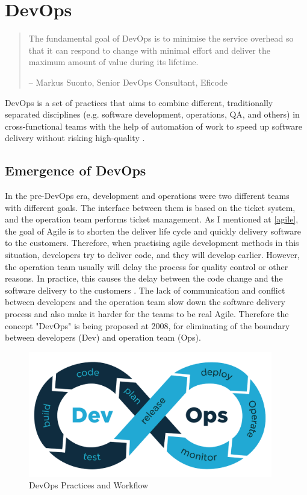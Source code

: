 \section{DevOps}
\begin{quotation}
    The fundamental goal of DevOps is to minimise the service overhead so that it can respond to change with minimal effort and deliver the maximum amount of value during its lifetime.
    \begin{flushright}
        -- Markus Suonto, Senior DevOps Consultant, Eficode
    \end{flushright}
\end{quotation}
\label{devops}
DevOps is a set of practices that aims to combine different, traditionally separated disciplines (e.g. software development, operations, QA, and others) in cross-functional teams with the help of automation of work to speed up software delivery without risking high-quality \cite{bass2015devops}.
\subsection{Emergence of DevOps}
In the pre-DevOps era, development and operations were two different teams with different goals. The interface between them is based on the ticket system, and the operation team performs ticket management. As I mentioned at \ref{agile}, the goal of Agile is to shorten the deliver life cycle and quickly delivery software to the customers. Therefore, when practising agile development methods in this situation, developers try to deliver code, and they will develop earlier.
However, the operation team usually will delay the process for quality control or other reasons. In practice, this causes the delay between the code change and the software delivery to the customers \cite{leite2019survey}. The lack of communication and conflict between developers and the operation team slow down the software delivery process and also make it harder for the teams to be real Agile. Therefore the concept "DevOps" is being proposed at 2008, for eliminating of the boundary between developers (Dev) and operation team (Ops).
\begin{figure}[h]
    \centering
    \includegraphics[width=0.95\textwidth]{pics/DevOps.png}
    \caption{DevOps Practices and Workflow \cite{DevOpsin72:online}}
    \label{fig:DevOps}
\end{figure}
